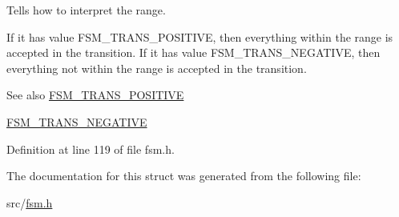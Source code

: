 \-Tells how to interpret the range. 

\-If it has value \-F\-S\-M\-\_\-\-T\-R\-A\-N\-S\-\_\-\-P\-O\-S\-I\-T\-I\-V\-E, then everything within the range is accepted in the transition. \-If it has value \-F\-S\-M\-\_\-\-T\-R\-A\-N\-S\-\_\-\-N\-E\-G\-A\-T\-I\-V\-E, then everything not within the range is accepted in the transition.

\begin{DoxySeeAlso}{\-See also}
\hyperlink{fsm_8h_a792cb9bba1114fc1a5d50457e54b5478}{\-F\-S\-M\-\_\-\-T\-R\-A\-N\-S\-\_\-\-P\-O\-S\-I\-T\-I\-V\-E} 

\hyperlink{fsm_8h_a65d49ee6a31fba2735a0fa4e7235ae7f}{\-F\-S\-M\-\_\-\-T\-R\-A\-N\-S\-\_\-\-N\-E\-G\-A\-T\-I\-V\-E} 
\end{DoxySeeAlso}


\-Definition at line 119 of file fsm.\-h.



\-The documentation for this struct was generated from the following file\-:\begin{DoxyCompactItemize}
\item 
src/\hyperlink{fsm_8h}{fsm.\-h}\end{DoxyCompactItemize}
